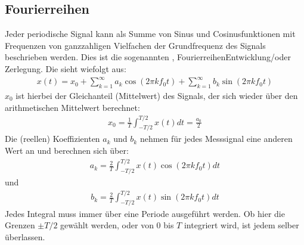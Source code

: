 \documentclass[letterpaper,10pt,english]{jupyterBook}
\begin{document}
\subsection{Fourierreihen}
\label{\detokenize{content/3_FourierAnalyse:fourierreihen}}
\sphinxAtStartPar
Jeder periodische Signal kann als Summe von Sinus\sphinxhyphen{} und Cosinusfunktionen mit Frequenzen von ganzzahligen Vielfachen der Grundfrequenz des Signals beschrieben werden. Dies ist die sogenannten , Fourierreihen\sphinxhyphen{}Entwicklung/oder \sphinxhyphen{}Zerlegung. Die  sieht wiefolgt aus:
\begin{equation*}
\begin{split}x(t) = x_0 + \sum_{k=1}^{\infty} a_k \cos(2\pi k f_0 t) + \sum_{k=1}^{\infty} b_k \sin(2\pi k f_0 t)\end{split}
\end{equation*}
\sphinxAtStartPar
\(x_0\) ist hierbei der Gleichanteil (Mittelwert) des Signals, der sich wieder über den arithmetischen Mittelwert berechnet:
\begin{equation*}
\begin{split}x_0 = \frac{1}{T} \int_{-T/2}^{T/2} x(t) dt = \frac{a_0}{2}\end{split}
\end{equation*}
\sphinxAtStartPar
Die (reellen) Koeffizienten \(a_k\) und \(b_k\) nehmen für jedes Messsignal eine anderen Wert an und berechnen sich über:
\begin{equation*}
\begin{split}a_k = \frac{2}{T}  \int_{-T/2}^{T/2} x(t) \cos(2\pi k f_0 t) dt \end{split}
\end{equation*}
\sphinxAtStartPar
und
\begin{equation*}
\begin{split}b_k = \frac{2}{T}  \int_{-T/2}^{T/2} x(t) \sin(2\pi k f_0 t) dt\end{split}
\end{equation*}
\sphinxAtStartPar
Jedes Integral muss immer über eine Periode ausgeführt werden. Ob hier die Grenzen \(\pm T/2\) gewählt werden, oder von 0 bis \(T\) integriert wird, ist jedem selber überlassen.
\end{document}
